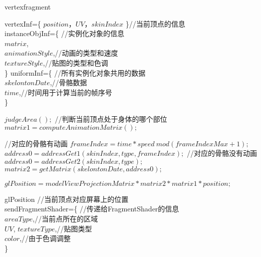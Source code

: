 \documentclass[11pt]{ctexart}
\begin{document}
  
	\begin{algorithm}  
		\caption{vertexfragment}  
		\begin{algorithmic} %
			
			\Require 	
			\State
			vertexInf=\{ $position$，$UV$，$skinIndex$   \}//当前顶点的信息 \\
			instanceObjInf=\{  //实例化对象的信息\\
				\qquad $matrix$,\\
				\qquad $animationStyle$,//动画的类型和速度\\
				\qquad $textureStyle$,//贴图的类型和色调\\
			\}
			\State
			uniformInf=\{  //所有实例化对象共用的数据\\
			\qquad $skelontonDate$,//骨骼数据\\
			\qquad $time$,//时间用于计算当前的帧序号\\
			\}
			
			 \State   
			
			  
			  \State $judgeArea();$ //判断当前顶点处于身体的哪个部位
			  \State  $matrix1=computeAnimationMatrix();$ 
			  
			  //对应的骨骼有动画
			  \State $frameIndex=time*speed \ mod (frameIndexMax+1);$
			  \State $address0=addressGet1(skinIndex,type,frameIndex);$
			  \Else  //对应的骨骼没有动画
			  \State $address0=addressGet2(skinIndex,type);$
			  \EndIf   
			  \State $matrix2=getMatrix(skelontonDate,address0);$
			  
			  
			  
			  \State  $glPosition = modelViewProjectionMatrix*matrix2*matrix1*position;$
			  
			

			  
			
			\Ensure
			\State
			glPosition //当前顶点对应屏幕上的位置 \\
			sendFragmentShader=\{  //传递给FragmentShader的信息\\
			\qquad $areaType$,//当前点所在的区域\\
			\qquad $UV$,
			\qquad $textureType$,//贴图类型\\
			\qquad $color$,//由于色调调整\\
			\}
			
		\end{algorithmic}  
	\end{algorithm}  
\end{document}

